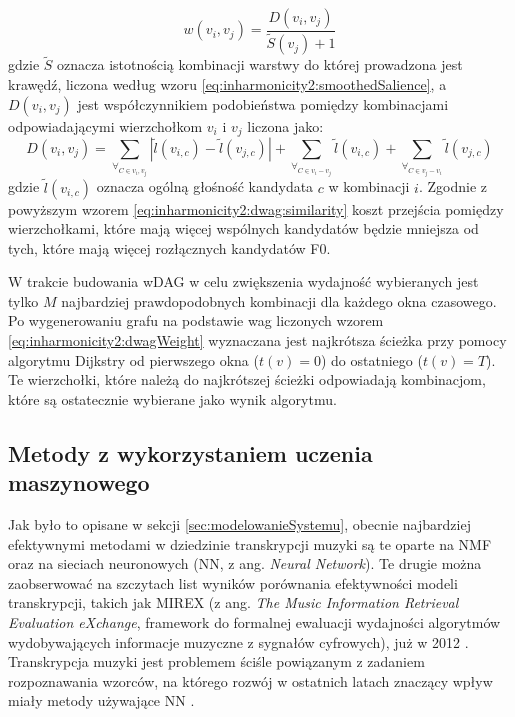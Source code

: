 \documentclass[12pt,a4paper,twoside]{mwart}
\begin{document}
\begin{equation}\label{eq:inharmonicity2:dwagWeight}
w(v_i, v_j) = \frac{D(v_i, v_j)}{\widetilde{S}(v_j) + 1}
\end{equation}
gdzie $\widetilde{S}$ oznacza istotnością kombinacji warstwy do której prowadzona jest krawędź, liczona według wzoru \ref{eq:inharmonicity2:smoothedSalience}, a $D(v_i, v_j)$ jest współczynnikiem podobieństwa pomiędzy kombinacjami odpowiadającymi wierzchołkom $v_i$ i $v_j$ liczona jako:
\begin{equation}\label{eq:inharmonicity2:dwag:similarity}
D(v_i, v_j) = \sum_{\forall_{C\in v_i, v_j}}\left|\widetilde{l}(v_{i,c}) - \widetilde{l}(v_{j,c}) \right| + \sum_{\forall_{C\in v_i - v_j}}\widetilde{l}(v_{i,c}) + \sum_{\forall_{C\in v_j - v_i}}\widetilde{l}(v_{j,c})
\end{equation}
gdzie $\widetilde{l}(v_{i,c})$ oznacza ogólną głośność kandydata $c$ w kombinacji $i$. Zgodnie z powyższym wzorem \ref{eq:inharmonicity2:dwag:similarity} koszt przejścia pomiędzy wierzchołkami, które mają więcej wspólnych kandydatów będzie mniejsza od tych, które mają więcej rozłącznych kandydatów F0.

W trakcie budowania wDAG w celu zwiększenia wydajność wybieranych jest tylko $M$ najbardziej prawdopodobnych kombinacji dla każdego okna czasowego. Po wygenerowaniu grafu na podstawie wag liczonych wzorem \ref{eq:inharmonicity2:dwagWeight} wyznaczana jest najkrótsza ścieżka przy pomocy algorytmu Dijkstry \cite{Transcription:Dijkstra:Graphs} od pierwszego okna ($t(v) = 0$) do ostatniego ($t(v) = T$). Te wierzchołki, które należą do najkrótszej ścieżki odpowiadają kombinacjom, które są ostatecznie wybierane jako wynik algorytmu.

\subsection{Metody z wykorzystaniem uczenia maszynowego}
Jak było to opisane w sekcji \ref{sec:modelowanieSystemu}, obecnie najbardziej efektywnymi metodami w dziedzinie transkrypcji muzyki są te oparte na NMF oraz na sieciach neuronowych (NN, z ang. \textit{Neural Network}). Te drugie można zaobserwować na szczytach list wyników porównania efektywności modeli transkrypcji, takich jak MIREX (z ang. \textit{The Music Information Retrieval Evaluation eXchange}, framework do formalnej ewaluacji wydajności algorytmów wydobywających informacje muzyczne z sygnałów cyfrowych), już w 2012 
\cite[415-416]{Transcription:Klapuri:ChallengesAndFuture}
. Transkrypcja muzyki jest problemem ściśle powiązanym z zadaniem rozpoznawania wzorców, na którego rozwój w ostatnich latach znaczący wpływ miały metody używające NN 
\cite[26-28]{DBLP:journals/spm/BenetosDDE19}
.
\end{document}
